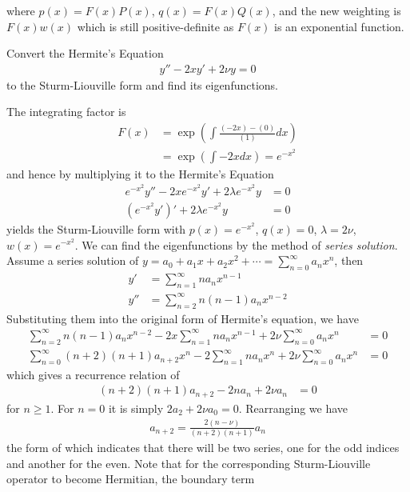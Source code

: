 where $p(x) = F(x)P(x)$, $q(x) = F(x)Q(x)$, and the new weighting is $F(x)w(x)$ which is still positive-definite as $F(x)$ is an exponential function.

\begin{exmp}
\label{exmp:hermiteeqn}
Convert the Hermite's Equation
\begin{align*}
y'' - 2xy' + 2\nu y = 0
\end{align*}
to the Sturm-Liouville form and find its eigenfunctions.
\end{exmp}
\begin{solution}
The integrating factor is
\begin{align*}
F(x) &= \exp(\int \frac{(-2x) - (0)}{(1)} dx) \\
&= \exp(\int -2x dx) = e^{-x^2}
\end{align*}
and hence by multiplying it to the Hermite's Equation
\begin{align*}
e^{-x^2}y'' - 2xe^{-x^2}y' + 2\lambda e^{-x^2} y &= 0 \\
(e^{-x^2}y')' + 2\lambda e^{-x^2} y &= 0
\end{align*}
yields the Sturm-Liouville form with $p(x) = e^{-x^2}$, $q(x) = 0$, $\lambda = 2\nu$, $w(x) = e^{-x^2}$. We can find the eigenfunctions by the method of \textit{series solution}. Assume a series solution of $y = a_0 + a_1x + a_2x^2 + \cdots = \sum_{n=0}^{\infty} a_n x^n$, then
\begin{align*}
y' &= \sum_{n=1}^{\infty} n a_nx^{n-1} \\
y'' &= \sum_{n=2}^{\infty} n(n-1) a_nx^{n-2}
\end{align*}
Substituting them into the original form of Hermite's equation, we have
\begin{align*}
\sum_{n=2}^{\infty} n(n-1) a_nx^{n-2} - 2x\sum_{n=1}^{\infty} n a_nx^{n-1} + 2\nu \sum_{n=0}^{\infty} a_n x^n &= 0 \\
\sum_{n=0}^{\infty} (n+2)(n+1) a_{n+2}x^{n} - 2\sum_{n=1}^{\infty} n a_nx^{n} + 2\nu \sum_{n=0}^{\infty} a_n x^n &= 0 
\end{align*}
which gives a recurrence relation of
\begin{align*}
(n+2)(n+1)a_{n+2} - 2n a_n + 2\nu a_n &= 0
\end{align*}
for $n \geq 1$. For $n=0$ it is simply $2a_2 + 2\nu a_0 = 0$. Rearranging we have
\begin{align*}
a_{n+2} = \frac{2(n-\nu)}{(n+2)(n+1)}a_n
\end{align*}
the form of which indicates that there will be two series, one for the odd indices and another for the even. Note that for the corresponding Sturm-Liouville operator to become Hermitian, the boundary term 

\end{solution}
